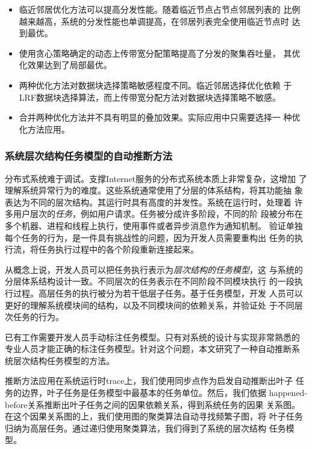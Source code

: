 \begin{itemize}

  \item 临近邻居优化方法可以提高分发性能。随着临近节点占节点邻居列表的
  比例越来越高，系统的分发性能也单调提高，在邻居列表完全使用临近节点时
  达到最优。

  \item 使用贪心策略确定的动态上传带宽分配策略提高了分发的聚集吞吐量，
  其优化效果达到了局部最优。
  
  \item 两种优化方法对数据块选择策略敏感程度不同。临近邻居选择优化依赖
  于LRF数据块选择算法，而上传带宽分配方法对数据块选择策略不敏感。

  \item 合并两种优化方法并不具有明显的叠加效果。实际应用中只需要选择一
  种优化方法应用。

\end{itemize}


\subsubsection*{系统层次结构任务模型的自动推断方法}

分布式系统难于调试。支撑Internet服务的分布式系统本质上非常复杂，这增加
了理解系统异常行为的难度。这些系统通常使用了分层的体系结构，将其功能抽
象表达为不同的层次结构。其运行时具有高度的并发性。系统在运行时，处理着
许多用户层次的\emph{任务}，例如用户请求。任务被分成许多阶段，不同的阶
段被分布在多个机器、进程和线程上执行，使用事件或者异步消息作为通知机制。
验证单独每个任务的行为，是一件具有挑战性的问题，因为开发人员需要重构出
任务的执行流，将任务执行过程中的各个阶段重新连接起来。

从概念上说，开发人员可以把任务执行表示为\emph{层次结构的任务模型}，这
与系统的分层体系结构设计一致。不同层次的任务表示在不同阶段不同模块执行
的一段执行过程。高层任务的执行被分为若干低层子任务。基于任务模型，开发
人员可以更好的理解系统模块间的结构，以及不同模块间的依赖关系，并验证处
于不同层次任务的行为。

已有工作需要开发人员手动标注任务模型。只有对系统的设计与实现非常熟悉的
专业人员才能正确的标注任务模型。针对这个问题，本文研究了一种自动推断系
统层次结构任务模型的方法。

推断方法应用在系统运行时trace上，我们使用同步点作为启发自动推断出叶子
任务的边界，叶子任务是任务模型中最基本的任务单位。然后，我们依据
happened-before关系推断出叶子任务之间的因果依赖关系，得到系统任务的因果
关系图。在这个因果关系图的上，我们使用图的聚类算法自动寻找频繁子图，将
叶子任务归纳为高层任务。通过递归使用聚类算法，我们得到了系统的层次结构
任务模型。

